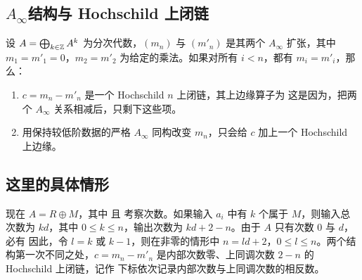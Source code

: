 \subsection{\texorpdfstring{$A_\infty$}{A∞}结构与 Hochschild 上闭链}
设 $A=\bigoplus_{k\in\mathbb Z}A^k$ 为分次代数，$(m_n)$ 与 $(m'_n)$ 是其两个 $A_\infty$ 扩张，其中 $m_1=m'_1=0$，$m_2=m'_2$ 为给定的乘法。如果对所有 $i<n$，都有 $m_i=m'_i$，那么：
\begin{enumerate}[label=(\roman*)]
\item $c=m_n-m'_n$ 是一个 Hochschild $n$ 上闭链，其上边缘算子为
这是因为，把两个 $A_\infty$ 关系相减后，只剩下这些项。
\item 用保持较低阶数据的严格 $A_\infty$ 同构改变 $m_n$，只会给 $c$ 加上一个 Hochschild 上边缘。
\end{enumerate}
\subsection{这里的具体情形}
现在 $A=R\oplus M$，其中
且
考察次数。如果输入 $a_i$ 中有 $k$ 个属于 $M$，则输入总次数为 $kd$，其中 $0\le k\le n$，输出次数为 $kd+2-n$。由于 $A$ 只有次数 $0$ 与 $d$，必有
因此，令 $l=k$ 或 $k-1$，则在非零的情形中 $n=ld+2$，$0\le l\le n$。两个结构第一次不同之处，$c=m_n-m'_n$ 是内部次数零、上同调次数 $2-n$ 的 Hochschild 上闭链，记作
下标依次记录内部次数与上同调次数的相反数。
